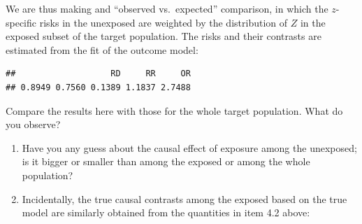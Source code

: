 \documentclass[
]{book}
\newenvironment{Shaded}{\begin{snugshade}}{\end{snugshade}}
\newcommand{\DecValTok}[1]{\textcolor[rgb]{0.00,0.00,0.81}{#1}}
\newcommand{\FunctionTok}[1]{\textcolor[rgb]{0.13,0.29,0.53}{\textbf{#1}}}
\newcommand{\NormalTok}[1]{#1}
\newcommand{\OtherTok}[1]{\textcolor[rgb]{0.56,0.35,0.01}{#1}}
\newcommand{\SpecialCharTok}[1]{\textcolor[rgb]{0.81,0.36,0.00}{\textbf{#1}}}
\begin{document}
We are thus making and ``observed vs.~expected'' comparison,
in which the
\(z\)-specific risks in the unexposed are weighted by the
distribution of
\(Z\) in the exposed subset of the target population.
The risks and their
contrasts are estimated from the fit of the outcome model:

\begin{Shaded}
\end{Shaded}

\begin{verbatim}
##                   RD     RR     OR 
## 0.8949 0.7560 0.1389 1.1837 2.7488
\end{verbatim}

Compare the results here with those for the whole target population. What do you observe?

\begin{enumerate}
\def\labelenumi{\arabic{enumi}.}
\setcounter{enumi}{1}
\item
  Have you any guess about the causal effect of exposure among
  the unexposed; is it bigger or smaller than among
  the exposed or among the whole population?
\item
  Incidentally, the true causal contrasts among the
  exposed based on the true model are similarly obtained
  from the quantities in item 4.2 above:
\end{enumerate}

\begin{Shaded}
\end{Shaded}
\end{document}
